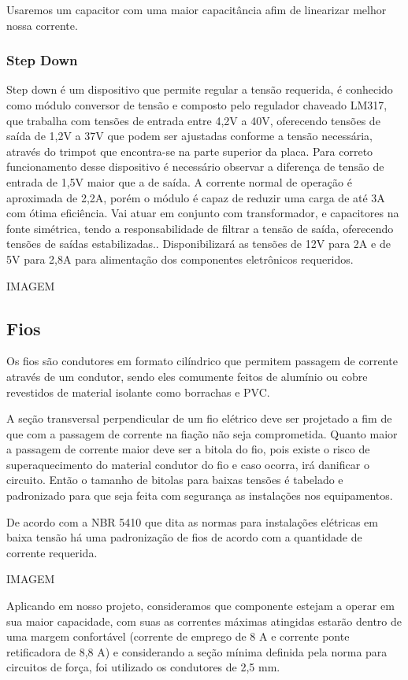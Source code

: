 Usaremos um capacitor com uma maior capacitância afim de linearizar melhor nossa corrente.

\subsubsection{Step Down}
Step down é um dispositivo que permite regular a tensão requerida, é conhecido como módulo conversor de tensão e composto pelo regulador chaveado LM317, que trabalha com tensões de entrada entre 4,2V a 40V, oferecendo tensões de saída de 1,2V a 37V que podem ser ajustadas conforme a tensão necessária, através do trimpot que encontra-se na parte superior da placa.
Para correto funcionamento desse dispositivo é necessário observar a diferença de tensão de entrada de 1,5V maior que a de saída. A corrente normal de operação é aproximada de 2,2A, porém o módulo é capaz de reduzir uma carga de até 3A com ótima eficiência.
Vai atuar em conjunto com transformador, e capacitores na fonte simétrica, tendo a responsabilidade de filtrar a tensão de saída, oferecendo tensões de saídas estabilizadas.. Disponibilizará as tensões de 12V para 2A e de 5V para 2,8A para alimentação dos componentes eletrônicos requeridos.

IMAGEM

\subsection{Fios}
Os fios são condutores em formato cilíndrico que permitem passagem de corrente através de um condutor, sendo eles comumente feitos de alumínio ou cobre revestidos de material isolante como borrachas e PVC.

A seção transversal perpendicular de um fio elétrico deve ser projetado a fim de que com a passagem de corrente na fiação não seja comprometida. Quanto maior a passagem de corrente maior deve ser a bitola do fio, pois existe o risco de superaquecimento do material condutor do fio e caso ocorra, irá danificar o circuito. Então o tamanho de bitolas para baixas tensões é tabelado e padronizado para que seja feita com segurança as instalações nos equipamentos.

De acordo com a NBR 5410 que dita as normas para instalações elétricas em baixa tensão há uma padronização de fios de acordo com a quantidade de corrente requerida.

IMAGEM

Aplicando em nosso projeto, consideramos que componente estejam a operar em sua maior capacidade, com suas as correntes máximas atingidas estarão dentro de uma margem confortável (corrente de emprego de 8 A e corrente ponte retificadora de 8,8 A) e considerando a seção mínima definida pela norma para circuitos de força, foi utilizado os condutores de 2,5 mm.

